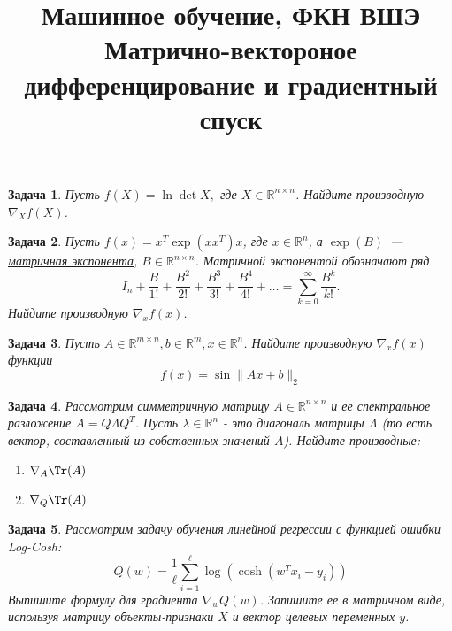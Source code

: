 \documentclass[12pt,fleqn]{article}
\title{Машинное обучение, ФКН ВШЭ\\Матрично-вектороное дифференцирование и градиентный спуск}
\author{}
\date{}
\newtheorem{esProblem}{Задача}
\begin{document}
\maketitle

\begin{esProblem}
    Пусть $f(X) = \ln \det X,$ где $X \in \mathbb{R}^{n\times n}$. Найдите производную $\nabla_X f(X)$.
\end{esProblem}

\begin{esProblem}
    Пусть $f(x) = x^T \exp(xx^T)x$, где $x \in \mathbb{R}^{n}$, а $\exp(B)$~--- \href{https://en.wikipedia.org/wiki/Matrix_exponential}{матричная экспонента},
    $B \in \mathbb{R}^{n \times n}$.
    Матричной экспонентой обозначают ряд
    \begin{equation*}
        I_n + \frac{B}{1!} + \frac{B^2}{2!} + \frac{B^3}{3!} + \frac{B^4}{4!} + \ldots = \sum_{k=0}^\infty \frac{B^k}{k!} .
    \end{equation*}
    Найдите производную $\nabla_x f(x)$.
\end{esProblem}

\begin{esProblem}
    Пусть $A \in \mathbb{R}^{m \times n}, b \in \mathbb{R}^m, x \in \mathbb{R}^n$. Найдите производную $\nabla_x f(x)$ функции
    \[
    f(x) = \sin \|Ax + b\|_2
    \]
\end{esProblem}

\begin{esProblem}
    Рассмотрим симметричную матрицу $A \in \mathbb{R}^{n \times n}$ и ее спектральное разложение $A = Q \Lambda Q^T$. Пусть $\lambda \in \mathbb{R}^n$ - это диагональ матрицы $\Lambda$ (то есть вектор, составленный из собственных значений $A$). Найдите производные:
    
    \begin{enumerate}
        \item $\displaystyle \nabla_A \Tr(A)$
        \item $\displaystyle \nabla_Q \Tr(A)$
    \end{enumerate}
\end{esProblem}

\begin{esProblem}
    Рассмотрим задачу обучения линейной регрессии с функцией ошибки Log-Cosh:
    \[
    Q(w) = \frac{1}{\ell} \sum_{i=1}^{\ell} \log (\cosh (w^T x_i - y_i))
    \]
    Выпишите формулу для градиента $\nabla_w Q(w)$. Запишите ее в матричном виде, используя матрицу объекты-признаки $X$ и вектор целевых переменных $y$.
\end{esProblem}
\end{document}
